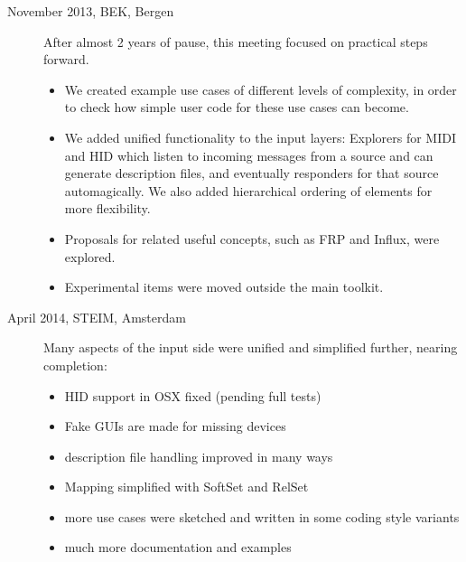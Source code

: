 \documentclass{article}
\begin{document}
\begin{description}
	\item[November 2013, BEK, Bergen] After almost 2 years of pause, this meeting focused on practical steps forward. 
	\begin{itemize}
		\item	We created example use cases of different levels of complexity, in order to check how simple user code for these use cases can become. 
		\item 	We added unified functionality to the input layers: Explorers for MIDI and HID which listen to incoming messages from a source and can generate description files, and eventually responders for that source automagically. We also added hierarchical ordering of elements for more flexibility. 
		\item 	Proposals for related useful concepts, such as FRP and Influx, were explored.
		\item	Experimental items were moved outside the main toolkit.
	\end{itemize}
		
		
		
		
	\item[April 2014, STEIM, Amsterdam] 	Many aspects of the input side were unified and simplified further, nearing completion:
	\begin{itemize} 
		\item HID support in OSX fixed (pending full tests)
		\item Fake GUIs are made for missing devices
		\item description file handling improved in many ways
		\item Mapping simplified with SoftSet and RelSet
		\item more use cases were sketched and written in some coding style variants
		\item much more documentation and examples
	\end{itemize}


\end{description}
\end{document}
